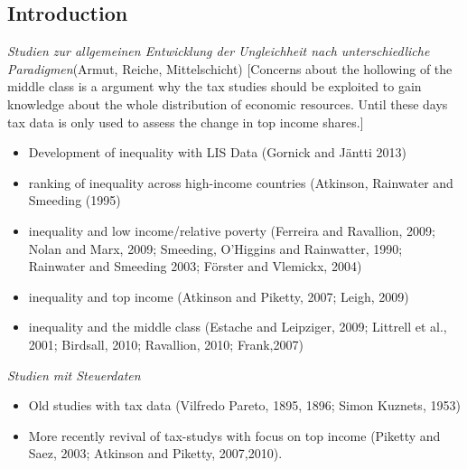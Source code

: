 \documentclass[twoside]{article}\usepackage[]{graphicx}\usepackage[]{color}
\begin{document}
\begin{multicols}{2} %




\section{Introduction}




\emph{Studien zur allgemeinen Entwicklung der Ungleichheit nach unterschiedliche Paradigmen}(Armut, Reiche, Mittelschicht)  [Concerns about the hollowing of the middle class is a argument why the tax studies should be exploited to gain knowledge about the whole distribution of economic resources. Until these days tax data is only used to assess the change in top income shares.] \\
\begin{itemize}
  \item Development of inequality with LIS Data (Gornick and Jäntti 2013)
  \item ranking of inequality across high-income countries (Atkinson, Rainwater and Smeeding (1995)
   \item inequality and low income/relative poverty (Ferreira and Ravallion, 2009; Nolan and Marx, 2009; Smeeding, O’Higgins and Rainwatter, 1990; Rainwater and Smeeding 2003; Förster and Vlemickx, 2004)
  \item inequality and top income (Atkinson and Piketty, 2007; Leigh, 2009)
  \item inequality and the middle class (Estache and Leipziger, 2009; Littrell et al., 2001; Birdsall, 2010; Ravallion, 2010; Frank,2007)
\end{itemize}


\emph{Studien mit Steuerdaten}
\begin{itemize}
\item Old studies with tax data (Vilfredo Pareto, 1895, 1896; Simon Kuznets, 1953)
\item More recently revival of tax-studys with focus on top income (Piketty and Saez, 2003; Atkinson and Piketty, 2007,2010).
\end{itemize}


\end{multicols}
\end{document}
